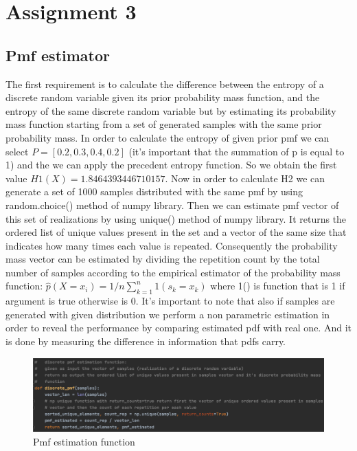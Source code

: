 \documentclass[12pt]{report}
\begin{document}
\chapter{Assignment 3}
\section{Pmf estimator}
The first requirement is to calculate the difference between the entropy of a discrete random variable given its prior probability mass function, and the entropy of the same discrete random variable but by estimating its probability mass function starting from a set of generated samples with the same prior probability mass.
In order to calculate the entropy of given prior pmf we can select $P = [0.2,0.3,0.4,0.2]$ (it's important that the summation of p is equal to 1) and the we can apply the precedent entropy function. So we obtain the first value $H1(X) = 1.8464393446710157$. Now in order to calculate H2 we can generate a set of 1000 samples distributed with the same pmf by using random.choice() method of numpy library. Then we can estimate pmf vector of this set of realizations by using unique() method of numpy library. It returns the ordered list of unique values present in the set and a vector of the same size that indicates how many times each value is repeated. Consequently the probability mass vector can be estimated by dividing the repetition count by the total number of samples according to the empirical estimator of the probability mass function: \newline
$\hat{p}(X = x_{i}) = 1/n \sum_{k=1}^{n} 1(s_{k} = x_{k})$  \newline
where 1() is function that is 1 if argument is true otherwise is 0. It's important to note that also if samples are generated with given distribution we perform a non parametric estimation in order to reveal the performance by comparing estimated pdf with real one. And it is done by measuring the difference in information that pdfs carry.

\begin{figure}[h!]
    \centering
    \includegraphics[width=16cm]{Pictures/pmf estimation.png}
    \caption{Pmf estimation function}
\end{figure}
\end{document}

